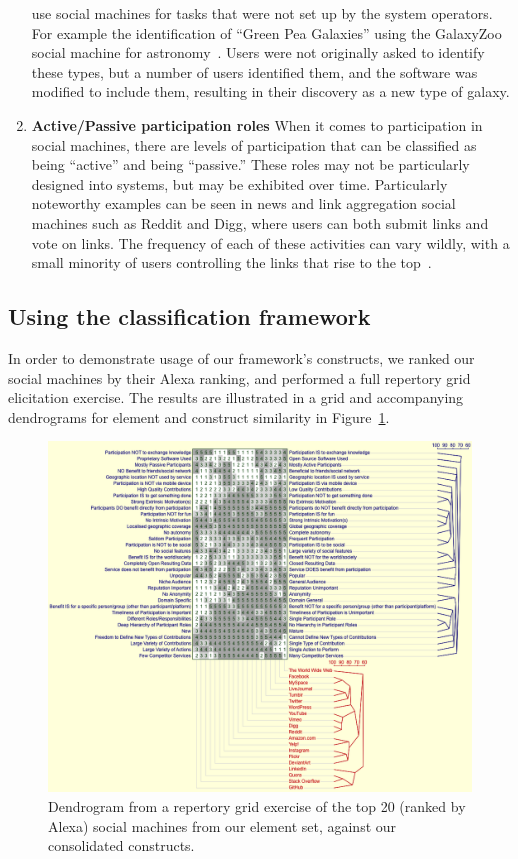 \documentclass{sig-alternate}
\begin{document}
\begin{enumerate}
    use social machines for tasks that were not set up by the system operators. For example
    the identification of ``Green Pea Galaxies'' using the GalaxyZoo social machine for
    astronomy~\cite{greenpea}. Users were not originally asked to identify these types, but
    a number of users identified them, and the software was modified to include them,
    resulting in their discovery as a new type of galaxy.
\item {\bf Active/Passive participation roles}
    \newline When it comes to participation in social machines, there are levels of
    participation that can be classified as being ``active'' and being ``passive.'' These
    roles may not be particularly designed into systems, but may be exhibited over time.
    Particularly noteworthy examples can be seen in news and link aggregation social
    machines such as Reddit and Digg, where users can both submit links and vote on links.
    The frequency of each of these activities can vary wildly, with a small
    minority of users controlling the links that rise to the top~\cite{digg}.
\end{enumerate}

\subsection{Using the classification framework}

In order to demonstrate usage of our framework's constructs, we ranked our social machines
by their Alexa ranking, and performed a full repertory grid elicitation exercise. The
results are illustrated in a grid and accompanying dendrograms for element and construct
similarity in Figure~\ref{dendrogram}.

\begin{figure}
\begin{center}
\includegraphics[width=18cm]{img/dendrogram.png}
\caption{Dendrogram from a repertory grid exercise of the top 20 (ranked by Alexa) social machines from our element set, against our consolidated constructs.} \label{dendrogram}
\end{center}
\end{figure}
\end{document}
